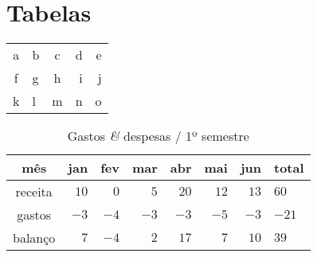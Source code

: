 \section{Tabelas}

\begin{center}
\begin{tabular}{clcr|r|}
  a & b & c & d & e\\
  f & g & h & i & j\\
  \hline
  k & l & m & n & o
\end{tabular}
\end{center}


\begin{table}\centering
  \caption{Gastos {\it \&} despesas / 1º semestre}

  \begin{tabular}{crrrrrrl}
    mês & jan & fev & mar & abr & mai & jun & total\\
    \hline
  receita & $10$ & $0$ & $5$ & $20$ & $12$ & $13$ & $60$\\
  gastos  & $-3$ & $-4$ & $-3$ & $-3$ & $-5$ & $-3$ & $-21$ \\
  \hline
  balanço & $7$ & $-4$ & $2$ & $17$ & $7$ & $10$ & $39$\\
  \end{tabular}
\end{table}
